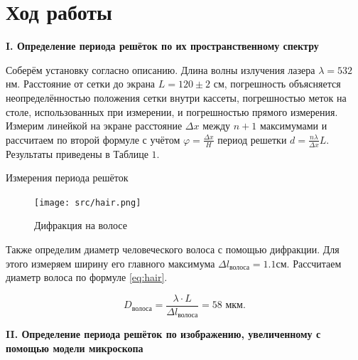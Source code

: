 \documentclass[12pt,a4paper]{article}
\begin{document}
 
    \section*{Ход работы}
	
	\begin{center}
		\textbf{I. Определение периода решёток по их пространственному спектру}
	\end{center}

    Соберём установку согласно описанию. Длина волны излучения лазера $\lambda=532$ нм.
    Расстояние от сетки до экрана $L=120 \pm 2$ см, погрешность объясняется неопределённостью положения сетки внутри кассеты, погрешностью меток на столе, использованных при измерении, и погрешностью прямого измерения. Измерим линейкой на экране расстояние $\Delta x$ между $n+1$ максимумами и рассчитаем по второй формуле с учётом $\varphi=\frac{\Delta x}{H}$ период решетки $d = \frac{n\lambda}{\Delta x}L$. Результаты приведены в Таблице $1 .$
    



        \begin{table}[h!]
    	   \centering
    	   \footnotesize
    	   
    	   \caption{Измерения периода решёток}
    	   \label{tab:t1}
        \end{table}
        
		\begin{figure}[H]
			\centering
			\texttt{[image: src/hair.png]}
			\caption{Дифракция на волосе}
		\end{figure}

    Также определим диаметр человеческого волоса с помощью дифракции. Для этого измеряем ширину его главного максимума ${\Delta l}_{\text{волоса}} = 1.1 \text{см}$. Рассчитаем диаметр волоса по формуле \ref{eq:hair}.

    \begin{equation}
        D_\text{волоса} = \frac{\lambda \cdot L}{{\Delta l}_{\text{волоса}}} = 58  \text{ мкм}.
        \label{eq:hair}
    \end{equation}


	\begin{center}
		\textbf{II. Определение периода решёток по изображению, увеличенному с помощью модели микроскопа}
	\end{center}
\end{document}
